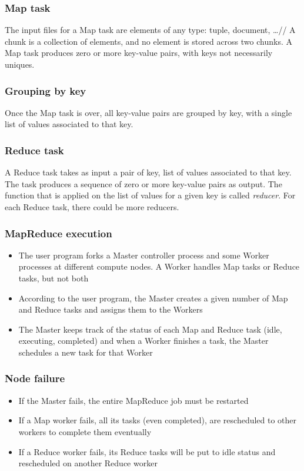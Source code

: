\documentclass[\main/main.tex]{subfiles}
\begin{document}
\subsubsection{Map task}
The input files for a Map task are elements of any type: tuple, document, \dots //
A chunk is a collection of elements, and no element is stored across two chunks. 
A Map task produces zero or more key-value pairs, with keys not necessarily uniques.
\subsubsection{Grouping by key}
Once the Map task is over, all key-value pairs are grouped by key, with a single list of values associated to that key.
\subsubsection{Reduce task}
A Reduce task takes as input a pair of key, list of values associated to that key. The task produces a sequence of zero or more key-value pairs as output. The function that is applied on the list of values for a given key is called \emph{reducer}. For each Reduce task, there could be more reducers.
\subsubsection{MapReduce execution}
\begin{itemize}
    \item The user program forks a Master controller process and some Worker processes at different compute nodes. A Worker handles Map tasks or Reduce tasks, but not both
    \item According to the user program, the Master creates a given number of Map and Reduce tasks and assigns them to the Workers
    \item The Master keeps track of the status of each Map and Reduce task (idle, executing, completed) and when a Worker finishes a task, the Master schedules a new task for that Worker
\end{itemize}
\subsubsection{Node failure}
\begin{itemize}
    \item If the Master fails, the entire MapReduce job must be restarted
    \item If a Map worker fails, all its tasks (even completed), are rescheduled to other workers to complete them eventually
    \item If a Reduce worker fails, its Reduce tasks will be put to idle status and rescheduled on another Reduce worker
\end{itemize}
\end{document}
